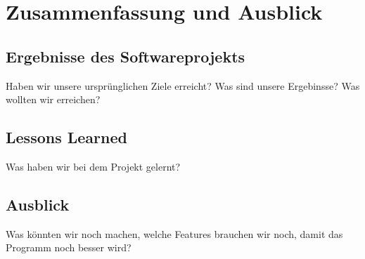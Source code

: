 \section{Zusammenfassung und Ausblick}
\label{sec:zusammenfassung}

\subsection{Ergebnisse des Softwareprojekts}
\label{subsec:ergebnisse}

Haben wir unsere ursprünglichen Ziele erreicht? Was sind unsere Ergebinsse? Was wollten wir erreichen?

\subsection{Lessons Learned}
\label{subsec:lessons}

Was haben wir bei dem Projekt gelernt?

\subsection{Ausblick}
\label{subsec:ausblick}

Was könnten wir noch machen, welche Features brauchen wir noch, damit das Programm noch besser wird?